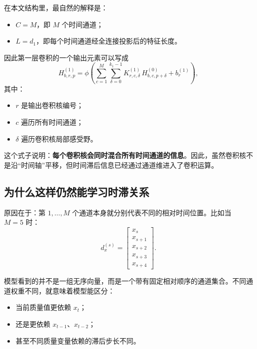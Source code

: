 \documentclass[UTF8]{ctexart}
\begin{document}
在本文结构里，最自然的解释是：
\begin{itemize}
    \item $C=M$，即 $M$ 个时间通道；
    \item $L=d_1$，即每个时间通道经全连接投影后的特征长度。
\end{itemize}

因此第一层卷积的一个输出元素可以写成
\begin{equation}
    H^{(1)}_{b,r,p}
    =
    \phi\!\left(
        \sum_{c=1}^{M}
        \sum_{\delta=0}^{k_1-1}
        K^{(1)}_{r,c,\delta}\,
        H^{(0)}_{b,c,p+\delta}
        + b^{(1)}_r
    \right),
\end{equation}
其中：
\begin{itemize}
    \item $r$ 是输出卷积核编号；
    \item $c$ 遍历所有时间通道；
    \item $\delta$ 遍历卷积核局部感受野。
\end{itemize}

这个式子说明：\textbf{每个卷积核会同时混合所有时间通道的信息}。因此，虽然卷积核不是沿“时间轴”平移，但时间滞后信息已经通过通道维进入了卷积运算。

\subsection{为什么这样仍然能学习时滞关系}

原因在于：第 $1,\dots,M$ 个通道本身就分别代表不同的相对时间位置。比如当 $M=5$ 时：
\begin{equation}
    d_x^{(s)} =
    \begin{bmatrix}
        x_s \\
        x_{s+1} \\
        x_{s+2} \\
        x_{s+3} \\
        x_{s+4}
    \end{bmatrix}.
\end{equation}

模型看到的并不是一组无序向量，而是一个带有固定相对顺序的通道集合。不同通道权重不同，就意味着模型能区分：
\begin{itemize}
    \item 当前质量值更依赖 $x_t$；
    \item 还是更依赖 $x_{t-1}$、$x_{t-2}$；
    \item 甚至不同质量变量依赖的滞后步长不同。
\end{itemize}
\end{document}
